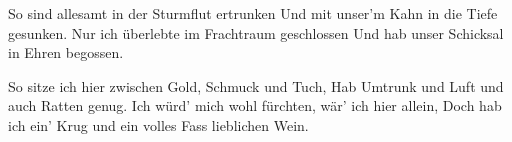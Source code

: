 \begin{guitar}
	So sind allesamt in der Sturmflut ertrunken
	Und mit unser'm Kahn in die Tiefe gesunken.
	Nur ich überlebte im Frachtraum geschlossen
	Und hab unser Schicksal in Ehren begossen.
	
	So sitze ich hier zwischen Gold, Schmuck und Tuch,
	Hab Umtrunk und Luft und auch Ratten genug.
	Ich würd' mich wohl fürchten, wär' ich hier allein,
	Doch hab ich ein' Krug und ein volles Fass lieblichen Wein.
	
	\begin{highlightbar}
		  
	\end{highlightbar}
\end{guitar}

